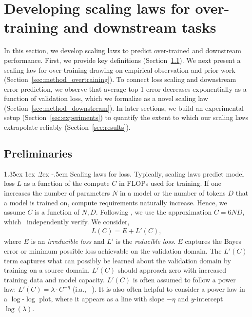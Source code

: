 \documentclass[dvipsnames,11pt]{article}
\makeatletter
\renewcommand\paragraph{\@startsection{paragraph}{4}{\z@}                                     {1.35ex \@plus1ex \@minus.2ex}                                {-.5em}
{\normalfont\normalsize\bfseries}}
\makeatother
\begin{document}
\section{Developing scaling laws for over-training and downstream tasks}
\label{sec:method}

In this section, we develop scaling laws to predict over-trained and downstream performance. 
First, we provide key definitions (Section~\ref{sec:def}).
We next present a scaling law for over-training drawing on empirical observation and prior work (Section~\ref{sec:method_overtraining}).
To connect loss scaling and downstream error prediction, we observe that average top-1 error decreases exponentially as a function of validation loss, which we formalize as a novel scaling law (Section~\ref{sec:method_downstream}).
In later sections, we build an experimental setup (Section~\ref{sec:experiments}) to quantify the extent to which our scaling laws extrapolate reliably (Section~\ref{sec:results}).

\subsection{Preliminaries}
\label{sec:def}

\paragraph{Scaling laws for loss.}
Typically, scaling laws predict model loss $L$ as a function of the compute $C$ in FLOPs used for training.
If one increases the number of parameters $N$ in a model or the number of tokens $D$ that a model is trained on, compute requirements naturally increase.
Hence, we assume $C$ is a function of $N, D$.
Following \citet{kaplan2020scaling}, we use the approximation $C=6ND$, which~\citet{chinchilla} independently verify.
We consider,
\begin{align}
\label{eq:general}
L(C) = E + L'(C),
\end{align}
where $E$ is an \emph{irreducible loss} and $L'$ is the \emph{reducible loss}.
$E$ captures the Bayes error or minimum possible loss achievable on the validation domain.
The $L'(C)$ term captures what can possibly be learned about the validation domain by training on a source domain.
$L'(C)$ should approach zero with increased training data and model capacity.
$L'(C)$ is often assumed to follow a power law: $L'(C) = \lambda \cdot C ^ {-\eta}$ (i.a., ~\citet{og_scaling,gpt4}).
It is also often helpful to consider a power law in a $\log$-$\log$ plot, where it appears as a line with slope $-\eta$ and $y$-intercept $\log{(\lambda)}$.
\end{document}
